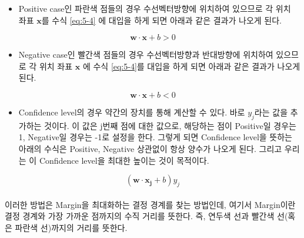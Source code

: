 \documentclass[a4paper]{oblivoir}
\begin{document}
\begin{itemize}\setlength\itemsep{-\parsep}
	\item Positive case인 파란색 점들의 경우 수선벡터방향에 위치하여 있으므로 각 위치 좌표 $\mathbf{x}$를 수식 \eqref{eq:5-4} 에 			대입을 하게 되면 아래과 같은 결과가 나오게 된다.
\end{itemize}
\begin{equation}
\mathbf{w\cdot x}+b>0
\label{eq:5-5}
\end{equation}
\begin{itemize}\setlength\itemsep{-\parsep}
	\item Negative case인 빨간색 점들의 경우 수선벡터방향과 반대방향에 위치하여 있으므로 각 위치 좌표 $\mathbf{x}$ 에 수식 				\eqref{eq:5-4}를 대입을 하게 되면 아래과 같은 결과가 나오게 된다.
\end{itemize}
\begin{equation}
\mathbf{w\cdot x}+b<0
\label{eq:5-6}
\end{equation}
\begin{itemize}\setlength\itemsep{-\parsep}
	\item Confidence level의 경우 약간의 장치를 통해 계산할 수 있다. 바로 $y_j$라는 값을 추가하는 것이다. 이 값은  j번째 점에 대한 값으로, 해당하는 점이 Positive일 경우는 1, Negative일 경우는 -1로 설정을 한다. 그렇게 되면 Confidence level을 뜻하는 아래의 수식은 Positive, Negative 상관없이 항상 양수가 나오게 된다. 그리고 우리는 이 Confidence level을 최대한 높이는 것이 목적이다.
\end{itemize}
\begin{equation}
(\mathbf{w\cdot x_j}+b)y_j
\label{eq:5-7}
\end{equation}\\
\indent 이러한 방법은 Margin을 최대화하는 결정 경계를 찾는 방법인데, 여기서 Margin이란 결정 경계와 가장 가까운 점까지의 수직 거리를 뜻한다. 즉, 연두색 선과 빨간색 선(혹은 파란색 선)까지의 거리를 뜻한다.\\

\end{document}
